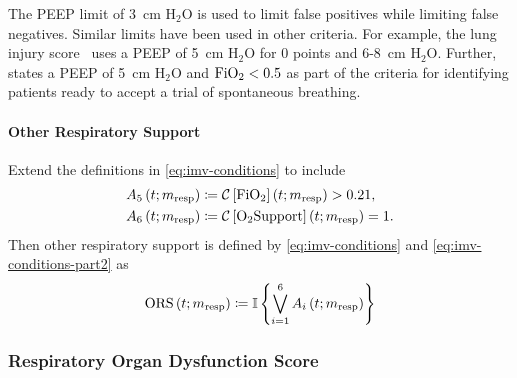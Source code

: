 \documentclass[letterpaper,10pt]{article}
\begin{document}
The PEEP limit of 3~cm H$_2$O is used to limit false positives while limiting false
negatives.  Similar limits have been used in other criteria.  For example, the
lung injury score~\citep{Martin2001} uses a PEEP of 5~cm H$_2$O for 0 points
and 6-8~cm H$_2$O.  Further, \cite{Martin2001} states a PEEP of 5~cm H$_2$O and
$\mathrm{FiO}_{2} < 0.5$ as part of the criteria for identifying patients ready to accept a
trial of spontaneous breathing.

\paragraph{Other Respiratory Support}

Extend the definitions in \eqref{eq:imv-conditions} to include
\begin{equation}
  \label{eq:imv-conditions-part2}
  \begin{aligned}
    A_{5}\left(t; m_{\mathrm{resp}}\right) &\coloneqq \mathcal{C}\left[\mathrm{FiO}_{2}\right]\left(t;m_{\mathrm{resp}}\right) > 0.21, \\
    A_{6}\left(t; m_{\mathrm{resp}}\right) &\coloneqq \mathcal{C}\left[\mathrm{O}_{2}\mathrm{Support}\right]\left(t;m_{\mathrm{resp}}\right) = 1. \\
  \end{aligned}
\end{equation}
Then other respiratory support is defined by \eqref{eq:imv-conditions} and \eqref{eq:imv-conditions-part2} as
\begin{equation}
  \label{eq:ors}
  \mathrm{ORS}\left(t; m_{\mathrm{resp}}\right) \coloneqq \mathbb{I}\left\{ \bigvee_{i=1}^{6} A_{i}\left(t; m_{\mathrm{resp}} \right) \right\}
\end{equation}

\subsubsection{Respiratory Organ Dysfunction Score}\label{sec:resp-odss}
\end{document}
